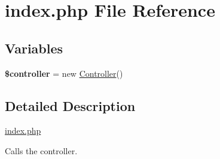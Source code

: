\hypertarget{index_8php}{\section{index.\-php File Reference}
\label{index_8php}
}
\subsection*{Variables}
\begin{DoxyCompactItemize}
\item 
\hypertarget{index_8php_a388ef7b1db5e6f728e63cee704ce6e23}{{\bfseries \$controller} = new \hyperlink{classController}{Controller}()}\label{index_8php_a388ef7b1db5e6f728e63cee704ce6e23}

\end{DoxyCompactItemize}


\subsection{Detailed Description}
\hyperlink{index_8php}{index.\-php}

Calls the controller. 
